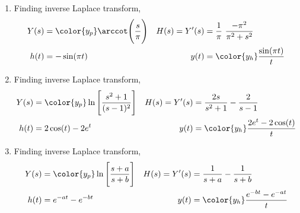 \begin{enumerate}
    \item Finding inverse Laplace transform,
          \begin{align}
              Y(s)         & = \color{y_p} \arccot \Bigg(\frac{s}{\pi}\Bigg) &
              H(s) = Y'(s) & = \frac{1}{\pi}\ \frac{-\pi^2}{\pi^2 + s^2}       \\
              h(t)         & = -\sin(\pi t)                                  &
              y(t)         & = \color{y_h} \frac{\sin(\pi t)}{t}
          \end{align}

    \item Finding inverse Laplace transform,
          \begin{align}
              Y(s)               & = \color{y_p} \ln \Bigg[\frac{s^2 + 1}
              {(s - 1)^2} \Bigg] &
              H(s) = Y'(s)       & = \frac{2s}{s^2 + 1} - \frac{2}{s - 1}    \\
              h(t)               & = 2\cos(t) - 2e^t                       &
              y(t)               & = \color{y_h} \frac{2e^t - 2\cos(t)}{t}
          \end{align}

    \item Finding inverse Laplace transform,
          \begin{align}
              Y(s)           & = \color{y_p} \ln \Bigg[\frac{s + a}
              {s + b} \Bigg] &
              H(s) = Y'(s)   & = \frac{1}{s + a} - \frac{1}{s + b}         \\
              h(t)           & = e^{-at} - e^{-bt}                       &
              y(t)           & = \color{y_h} \frac{e^{-bt} - e^{-at}}{t}
          \end{align}

\end{enumerate}
